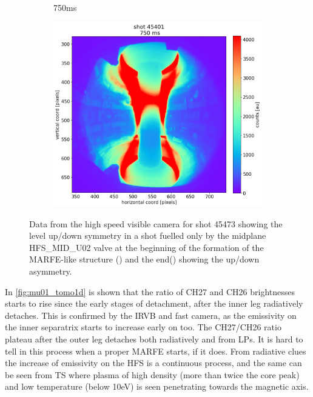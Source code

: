 \begin{figure}
\begin{subfigure}{0.3\linewidth}
         \caption{750ms}
         \label{fig:mu01_tomo4b}
    \end{subfigure}
    \begin{subfigure}{0.054\linewidth}
         \centering
         \vspace{-6mm}
         \includegraphics[trim={595 0 0 50},clip,width=\textwidth]{Chapters/chapter2/figs/45473_for_paper_750ms.png}
    \end{subfigure}
    \caption{Data from the high speed visible camera for shot 45473 showing the level up/down symmetry in a shot fuelled only by the midplane HFS\_MID\_U02 valve at the beginning of the formation of the MARFE-like structure () and the end() showing the up/down asymmetry.}
    \label{fig:mu01_tomo4}
\end{figure}

In \autoref{fig:mu01_tomo1d} is shown that the ratio of CH27 and CH26 brightnesses starts to rise since the early stages of detachment, after the inner leg radiatively detaches. This is confirmed by the IRVB and fast camera, as the emissivity on the inner separatrix starts to increase early on too. The CH27/CH26 ratio plateau after the outer leg detaches both radiatively and from LPs. It is hard to tell in this process when a proper MARFE starts, if it does. From radiative clues the increase of emissivity on the HFS is a continuous process, and the same can be seen from TS where plasma of high density (more than twice the core peak) and low temperature (below 10eV) is seen penetrating towards the magnetic axis.

